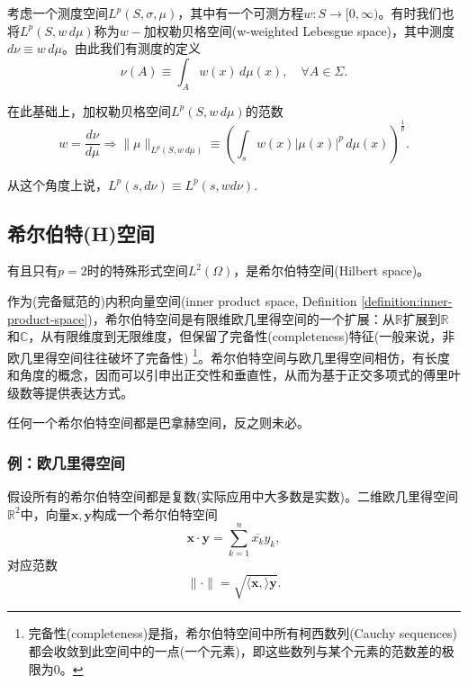 \begin{definition}[加权勒贝格空间]
  \label{definition:lp-weightd-lp}
  考虑一个测度空间$L^p \left( S, \sigma, \mu \right)$，其中有一个可测方程$w : S \rightarrow [ 0, \infty)$。有时我们也将$L^p \left(S, w \, d \mu \right)$称为$w-$加权勒贝格空间(w-weighted Lebesgue space)，其中测度$d \nu \equiv w \, d \mu$。由此我们有测度的定义
  \begin{equation*}
    \nu (A) \equiv \int_A w(x) \, d \mu(x), \quad \forall A \in \Sigma.
  \end{equation*}

在此基础上，加权勒贝格空间$L^p \left(S, w \, d \mu \right)$的范数
\begin{equation*}
  w = \frac{d \nu}{d \mu} \Rightarrow \Big\| \mu \Big\|_{L^p(S, w \, d\mu)} \equiv \left(
  \int_s w(x) \left| \mu(x) \right|^p \, d \mu(x)
  \right)^{\frac{1}{p}}.
\end{equation*}

从这个角度上说，$L^p (s, d \nu) \equiv L^p ( s, w d\nu)$.
\end{definition}

\subsection{希尔伯特(H)空间}
\label{sec:lp-hilbert-space}
有且只有$p=2$时的特殊形式空间$L^2(\Omega)$，是希尔伯特空间(Hilbert space)。

作为(完备赋范的)内积向量空间(inner product space, Definition \ref{definition:inner-product-space})，希尔伯特空间是有限维欧几里得空间的一个扩展：从$\mathbb{R}$扩展到$\mathbb{R}$和$\mathbb{C}$，从有限维度到无限维度，但保留了完备性(completeness)特征(一般来说，非欧几里得空间往往破坏了完备性) \label{footnote:completeness-def}\footnote{完备性(completeness)是指，希尔伯特空间中所有柯西数列(Cauchy sequences) 都会收敛到此空间中的一点(一个元素)，即这些数列与某个元素的范数差的极限为$0$。}。希尔伯特空间与欧几里得空间相仿，有长度和角度的概念，因而可以引申出正交性和垂直性，从而为基于正交多项式的傅里叶级数等提供表达方式。

任何一个希尔伯特空间都是巴拿赫空间，反之则未必。

\subsubsection{例：欧几里得空间}
\label{sec:hilbert-space-eucilidean-examples}
假设所有的希尔伯特空间都是复数(实际应用中大多数是实数)。二维欧几里得空间$\mathbb{R}^2$中，向量$\bm{x},\bm{y}$构成一个希尔伯特空间
\begin{equation*}
  \bm{x} \cdot \bm{y} = \sum_{k=1}^{n} \overline{x_k} y_k,
\end{equation*}
对应范数
\begin{equation*}
\| \cdot \| = \sqrt{\langle \bm{x}, \rangle{\bm{y}}}.
\end{equation*}

